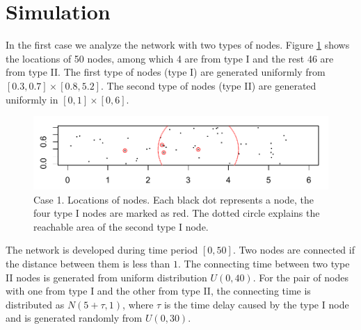 
\section{Simulation} \label{sec:simulation}

In the first case we analyze the network with two types of nodes.
Figure \ref{fig: nodes locations} shows the locations of 50 nodes, among which 4 are from type I and the rest 46 are from type II.
The first type of nodes (type I) are generated uniformly from $[0.3, 0.7]\times[0.8, 5.2]$.
The second type of nodes (type II) are generated uniformly in $[0,1]\times[0,6]$. 
\\
\begin{figure}[htbp]
\includegraphics[width=.8\linewidth]{../simulation/plots/nodes_1_108}
\caption{Case 1. Locations of nodes. Each black dot represents a node, the four type I nodes are marked as red. The dotted circle explains the reachable area of the second type I node. }
\label{fig: nodes locations}
\end{figure}

\noindent
The network is developed during time period $[0,50]$.
Two nodes are connected if the distance between them is less than $1$.
The connecting time between two type II nodes is generated from uniform distribution $U(0,40)$.
For the pair of nodes with one from type I and the other from type II, the connecting time is distributed as $N(5+\tau,1)$, where $\tau$ is the time delay caused by the type I node and is generated randomly from $U(0,30)$.

